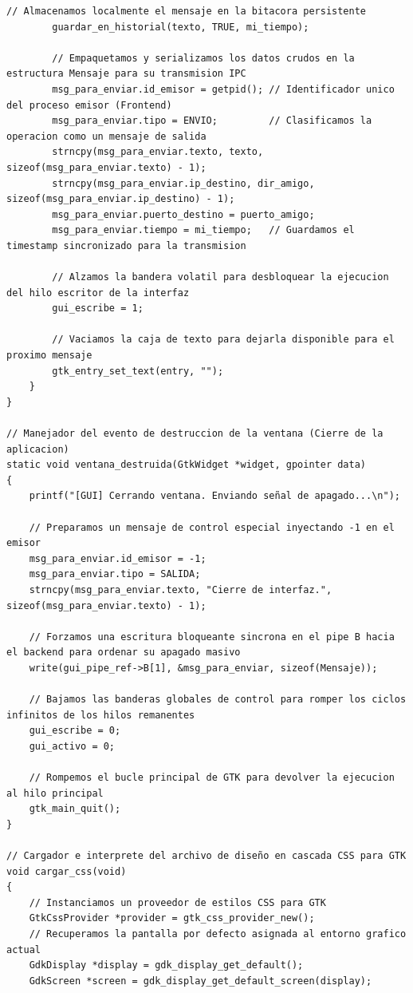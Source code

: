 \begin{lstlisting}[style=estiloC, caption={Archivo del Front-End (conexion P2P)}]
        // Almacenamos localmente el mensaje en la bitacora persistente
        guardar_en_historial(texto, TRUE, mi_tiempo);

        // Empaquetamos y serializamos los datos crudos en la estructura Mensaje para su transmision IPC
        msg_para_enviar.id_emisor = getpid(); // Identificador unico del proceso emisor (Frontend)
        msg_para_enviar.tipo = ENVIO;         // Clasificamos la operacion como un mensaje de salida
        strncpy(msg_para_enviar.texto, texto, sizeof(msg_para_enviar.texto) - 1);
        strncpy(msg_para_enviar.ip_destino, dir_amigo, sizeof(msg_para_enviar.ip_destino) - 1);
        msg_para_enviar.puerto_destino = puerto_amigo;
        msg_para_enviar.tiempo = mi_tiempo;   // Guardamos el timestamp sincronizado para la transmision

        // Alzamos la bandera volatil para desbloquear la ejecucion del hilo escritor de la interfaz
        gui_escribe = 1;

        // Vaciamos la caja de texto para dejarla disponible para el proximo mensaje
        gtk_entry_set_text(entry, "");
    }
}

// Manejador del evento de destruccion de la ventana (Cierre de la aplicacion)
static void ventana_destruida(GtkWidget *widget, gpointer data)
{
    printf("[GUI] Cerrando ventana. Enviando señal de apagado...\n");

    // Preparamos un mensaje de control especial inyectando -1 en el emisor
    msg_para_enviar.id_emisor = -1;
    msg_para_enviar.tipo = SALIDA;
    strncpy(msg_para_enviar.texto, "Cierre de interfaz.", sizeof(msg_para_enviar.texto) - 1);
    
    // Forzamos una escritura bloqueante sincrona en el pipe B hacia el backend para ordenar su apagado masivo
    write(gui_pipe_ref->B[1], &msg_para_enviar, sizeof(Mensaje));
    
    // Bajamos las banderas globales de control para romper los ciclos infinitos de los hilos remanentes
    gui_escribe = 0; 
    gui_activo = 0; 
    
    // Rompemos el bucle principal de GTK para devolver la ejecucion al hilo principal
    gtk_main_quit();
}

// Cargador e interprete del archivo de diseño en cascada CSS para GTK
void cargar_css(void)
{
    // Instanciamos un proveedor de estilos CSS para GTK
    GtkCssProvider *provider = gtk_css_provider_new();
    // Recuperamos la pantalla por defecto asignada al entorno grafico actual
    GdkDisplay *display = gdk_display_get_default();
    GdkScreen *screen = gdk_display_get_default_screen(display);
    

\end{lstlisting}

